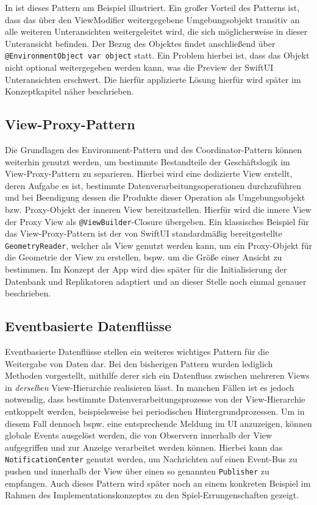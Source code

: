 In  ist dieses Pattern am Beispiel illustriert. Ein großer Vorteil des Patterns ist, dass das über den ViewModifier weitergegebene Umgebungsobjekt transitiv an alle weiteren Unteransichten weitergeleitet wird, die sich möglicherweise in dieser Unteransicht befinden. Der Bezug des Objektes findet anschließend über \texttt{@EnvironmentObject var object} statt. Ein Problem hierbei ist, dass das Objekt nicht optional weitergegeben werden kann, was die Preview der SwiftUI Unteransichten erschwert. Die hierfür applizierte Lösung hierfür wird später im Konzeptkapitel näher beschrieben.

\subsection{View-Proxy-Pattern}

Die Grundlagen des Environment-Pattern und des Coordinator-Pattern können weiterhin genutzt werden, um bestimmte Bestandteile der Geschäftslogik im View-Proxy-Pattern zu separieren. Hierbei wird eine dedizierte View erstellt, deren Aufgabe es ist, bestimmte Datenverarbeitungsoperationen durchzuführen und bei Beendigung dessen die Produkte dieser Operation als Umgebungsobjekt bzw. Proxy-Objekt der inneren View bereitzustellen. Hierfür wird die innere View der Proxy View als \texttt{@ViewBuilder}-Closure übergeben. Ein klassisches Beispiel für das View-Proxy-Pattern ist der von SwiftUI standardmäßig bereitgestellte \texttt{GeometryReader}, welcher als View genutzt werden kann, um ein Proxy-Objekt für die Geometrie der View zu erstellen, bspw. um die Größe einer Ansicht zu bestimmen. Im Konzept der App wird dies später für die Initialisierung der Datenbank und Replikatoren adaptiert und an dieser Stelle noch einmal genauer beschrieben.

\subsection{Eventbasierte Datenflüsse}

Eventbasierte Datenflüsse stellen ein weiteres wichtiges Pattern für die Weitergabe von Daten dar. Bei den bisherigen Pattern wurden lediglich Methoden vorgestellt, mithilfe derer sich ein Datenfluss zwischen mehreren Views in \textit{derselben} View-Hierarchie realisieren lässt. In manchen Fällen ist es jedoch notwendig, dass bestimmte Datenverarbeitungsprozesse von der View-Hierarchie entkoppelt werden, beispielsweise bei periodischen Hintergrundprozessen. Um in diesem Fall dennoch bspw. eine entsprechende Meldung im UI anzuzeigen, können globale Events ausgelöst werden, die von Observern innerhalb der View aufgegriffen und zur Anzeige verarbeitet werden können. Hierbei kann das \texttt{NotificationCenter} genutzt werden, um Nachrichten auf einen Event-Bus zu pushen und innerhalb der View über einen so genannten \texttt{Publisher} zu empfangen. Auch dieses Pattern wird später noch an einem konkreten Beispiel im Rahmen des Implementationskonzeptes zu den Spiel-Errungenschaften gezeigt.
